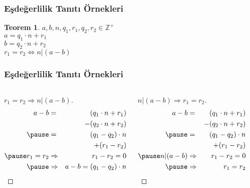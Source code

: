 \documentclass[dvipsnames]{beamer}
\theoremstyle{definition}
\theoremstyle{example}
\theoremstyle{plain}
\newtheorem{teorem}[theorem]{Teorem}
\begin{document}
\begin{frame}
  \frametitle{Eşdeğerlilik Tanıtı Örnekleri}

  \begin{teorem}
    $a,b,n,q_1,r_1,q_2,r_2 \in \mathbb{Z}^+$\\
    $a = q_1 \cdot n + r_1$\\
    $b = q_2 \cdot n + r_2$\\

    \bigskip
    $r_1 = r_2 \Leftrightarrow n | (a - b)$
  \end{teorem}
\end{frame}

\begin{frame}
  \frametitle{Eşdeğerlilik Tanıtı Örnekleri}

  \begin{columns}[t]
    \begin{proof}[$r_1 = r_2 \Rightarrow n | (a - b)$]
      \begin{eqnarray*}
        a - b & = & (q_1 \cdot n + r_1)\\
              &   & -(q_2 \cdot n + r_2)\\\pause
              & = & (q_1 - q_2) \cdot n\\
              &   & + (r_1 - r_2)\\\pause
        r_1 = r_2 & \Rightarrow & r_1 - r_2 = 0\\\pause
                  & \Rightarrow & a - b = (q_1 - q_2) \cdot n
      \end{eqnarray*}
    \end{proof}

    \pause
    \begin{proof}[$n | (a - b) \Rightarrow r_1 = r_2$]
      \begin{eqnarray*}
        a - b & = & (q_1 \cdot n + r_1)\\
              &   & -(q_2 \cdot n + r_2)\\\pause
              & = & (q_1 - q_2) \cdot n\\
              &   & + (r_1 - r_2)\\\pause
        n | (a - b) & \Rightarrow & r_1 - r_2 = 0\\\pause
                    & \Rightarrow & r_1 = r_2
      \end{eqnarray*}
    \end{proof}
  \end{columns}
\end{frame}
\end{document}
